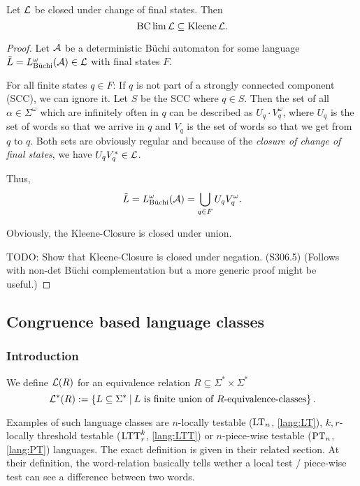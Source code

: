 \begin{lemma}
Let $\mathcal{L}$ be closed under change of final states. Then
\[ \operatorname{BC} \lim \mathcal{L} \subseteq \operatorname{Kleene} \mathcal{L} . \]
\begin{proof}
Let $\mathcal{A}$ be a deterministic Büchi automaton for some language $\tilde L = L^\omega_{\text{Büchi}}(\mathcal{A}) \in \mathcal{L}$ with final states $F$.

For all finite states $q \in F$: If $q$ is not part of a strongly connected component (SCC), we can ignore it. Let $S$ be the SCC where $q \in S$. Then the set of all $\alpha \in \Sigma^\omega$ which are infinitely often in $q$ can be described as $U_q \cdot V_q^\omega$, where $U_q$ is the set of words so that we arrive in $q$ and $V_q$ is the set of words so that we get from $q$ to $q$. Both sets are obviously regular and because of the \emph{closure of change of final states}, we have $U_q V_q^* \in \mathcal{L}$.

Thus,
\[ \tilde L = L^\omega_{\text{Büchi}}(\mathcal{A}) = \bigcup_{q \in F} U_q V_q^\omega . \]

Obviously, the Kleene-Closure is closed under union.

TODO: Show that Kleene-Closure is closed under negation. (S306.5) (Follows with non-det Büchi complementation but a more generic proof might be useful.)
\end{proof}
\end{lemma}


\subsection{Congruence based language classes}
\label{gen:R}

\subsubsection{Introduction}
\label{gen:R-automata}

\begin{mydef}
We define $\mathcal{L}(R)$ for an equivalence relation $R\subseteq\Sigma^* \times \Sigma^*$
\[ \Lang^*(R) := \Set{L \subseteq \Sigma^*}{L \text{ is finite union of $R$-equivalence-classes}} . \]
\end{mydef}

Examples of such language classes are $n$-locally testable ($\textup{\textrm{LT}}_n$, \cref{lang:LT}), $k,r$-locally threshold testable ($\textup{\textrm{LTT}}_r^k$, \cref{lang:LTT}) or $n$-piece-wise testable ($\textup{\textrm{PT}}_n$, \cref{lang:PT}) languages. The exact definition is given in their related section. At their definition, the word-relation basically tells wether a local test / piece-wise test can see a difference between two words.

